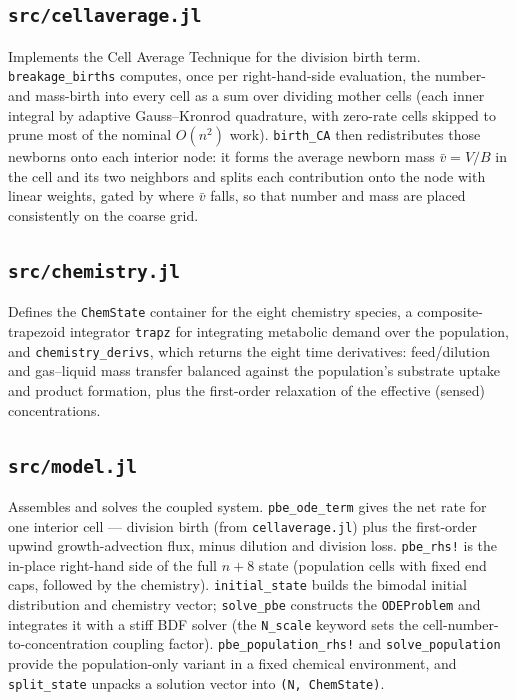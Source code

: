 \documentclass[11pt,a4paper]{article}
\begin{document}
\subsection{\texttt{src/cellaverage.jl}}
Implements the Cell Average Technique for the division birth term. \texttt{breakage\_births} computes,
once per right-hand-side evaluation, the number- and mass-birth into every cell as a sum over dividing
mother cells (each inner integral by adaptive Gauss--Kronrod quadrature, with zero-rate cells skipped to
prune most of the nominal $O(n^2)$ work). \texttt{birth\_CA} then redistributes those newborns onto each
interior node: it forms the average newborn mass $\bar v = V/B$ in the cell and its two neighbors and
splits each contribution onto the node with linear weights, gated by where $\bar v$ falls, so that number
and mass are placed consistently on the coarse grid.



\subsection{\texttt{src/chemistry.jl}}
Defines the \texttt{ChemState} container for the eight chemistry species, a composite-trapezoid
integrator \texttt{trapz} for integrating metabolic demand over the population, and
\texttt{chemistry\_derivs}, which returns the eight time derivatives: feed/dilution and gas--liquid mass
transfer balanced against the population's substrate uptake and product formation, plus the first-order
relaxation of the effective (sensed) concentrations.



\subsection{\texttt{src/model.jl}}
Assembles and solves the coupled system. \texttt{pbe\_ode\_term} gives the net rate for one interior cell
--- division birth (from \texttt{cellaverage.jl}) plus the first-order upwind growth-advection flux, minus
dilution and division loss. \texttt{pbe\_rhs!} is the in-place right-hand side of the full $n+8$ state
(population cells with fixed end caps, followed by the chemistry). \texttt{initial\_state} builds the
bimodal initial distribution and chemistry vector; \texttt{solve\_pbe} constructs the \texttt{ODEProblem}
and integrates it with a stiff BDF solver (the \texttt{N\_scale} keyword sets the
cell-number-to-concentration coupling factor). \texttt{pbe\_population\_rhs!} and \texttt{solve\_population}
provide the population-only variant in a fixed chemical environment, and \texttt{split\_state} unpacks a
solution vector into \texttt{(N, ChemState)}.
\end{document}
